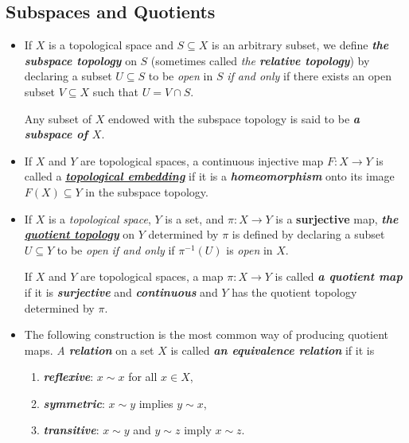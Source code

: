 \documentclass[11pt]{article}
\begin{document}
\subsection{Subspaces and Quotients}
\begin{itemize}
\item \begin{definition}
If $X$ is a topological space and $S \subseteq X$ is an arbitrary subset, we define \emph{\textbf{the subspace topology}} on $S$ (sometimes called \emph{the \textbf{relative topology}}) by declaring a subset $U \subseteq S$ to be \emph{open} in $S$ \emph{if and only} if there exists an open subset $V \subseteq X$ such that $U = V \cap S$. 

Any subset of $X$ endowed with the subspace topology is said to be \emph{\textbf{a subspace of $X$}}.
\end{definition}

\item \begin{definition}
If $X$ and $Y$ are topological spaces, a continuous injective map $F: X \rightarrow Y$ is called a \underline{\emph{\textbf{topological embedding}}} if it is a \emph{\textbf{homeomorphism}} onto its image $F(X) \subseteq Y$ in the subspace topology.
\end{definition}

\item \begin{definition}
If $X$ is a \emph{topological space}, $Y$ is a set, and $\pi: X \rightarrow Y$ is a \textbf{surjective} map, \emph{\textbf{the \underline{quotient topology}}} on $Y$ determined by $\pi$ is defined by declaring a subset $U \subseteq Y$ to be \emph{open} \emph{if and only} if $\pi^{-1}(U)$ is \emph{open} in $X$. 

If $X$ and $Y$ are topological spaces, a map $\pi: X \rightarrow Y$ is called \emph{\textbf{a quotient map}} if it is \emph{\textbf{surjective}} and \emph{\textbf{continuous}} and $Y$ has the quotient topology determined by $\pi$.
\end{definition}

\item \begin{definition}
The following construction is the most common way of producing quotient maps. \emph{A \textbf{relation}} on a set $X$ is called \emph{\textbf{an equivalence relation}} if it is 
\begin{enumerate}
\item \emph{\textbf{reflexive}}: $x \sim x$ for all $x \in X$,
\item \emph{\textbf{symmetric}}: $x \sim y$ implies $y \sim x$,
\item \emph{\textbf{transitive}}: $x \sim y$ and $y \sim z$ imply $x \sim z$.
\end{enumerate} 


\end{definition}
\end{itemize}
\end{document}
